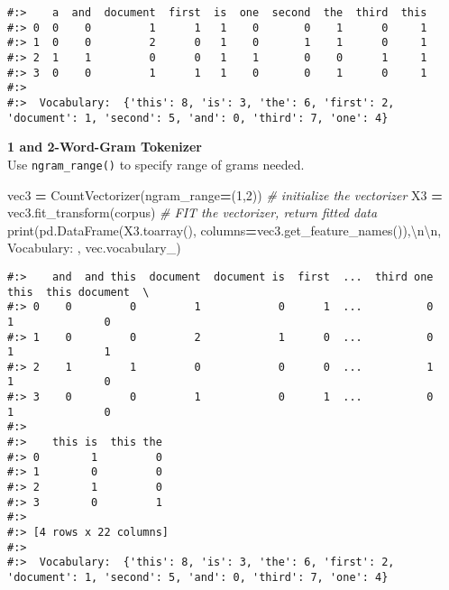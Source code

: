 \documentclass[
]{book}
\newenvironment{Shaded}{\begin{snugshade}}{\end{snugshade}}
\newcommand{\BuiltInTok}[1]{#1}
\newcommand{\CharTok}[1]{\textcolor[rgb]{0.5,0.5,0.5}{#1}}
\newcommand{\CommentTok}[1]{\textcolor[rgb]{0.37,0.37,0.37}{\textit{#1}}}
\newcommand{\DecValTok}[1]{\textcolor[rgb]{0.06,0.06,0.06}{#1}}
\newcommand{\NormalTok}[1]{#1}
\newcommand{\OperatorTok}[1]{\textcolor[rgb]{0.43,0.43,0.43}{\textbf{#1}}}
\newcommand{\StringTok}[1]{\textcolor[rgb]{0.5,0.5,0.5}{#1}}
\begin{document}
\begin{verbatim}
#:>    a  and  document  first  is  one  second  the  third  this
#:> 0  0    0         1      1   1    0       0    1      0     1
#:> 1  0    0         2      0   1    0       1    1      0     1
#:> 2  1    1         0      0   1    1       0    0      1     1
#:> 3  0    0         1      1   1    0       0    1      0     1 
#:> 
#:>  Vocabulary:  {'this': 8, 'is': 3, 'the': 6, 'first': 2, 'document': 1, 'second': 5, 'and': 0, 'third': 7, 'one': 4}
\end{verbatim}

\textbf{1 and 2-Word-Gram Tokenizer}\\
Use \texttt{ngram\_range()} to specify range of grams needed.

\begin{Shaded}
\begin{Highlighting}[]
\NormalTok{vec3 }\OperatorTok{=}\NormalTok{ CountVectorizer(ngram\_range}\OperatorTok{=}\NormalTok{(}\DecValTok{1}\NormalTok{,}\DecValTok{2}\NormalTok{))          }\CommentTok{\# initialize the vectorizer}
\NormalTok{X3   }\OperatorTok{=}\NormalTok{ vec3.fit\_transform(corpus)     }\CommentTok{\# FIT the vectorizer, return fitted data}
\BuiltInTok{print}\NormalTok{(pd.DataFrame(X3.toarray(), columns}\OperatorTok{=}\NormalTok{vec3.get\_feature\_names()),}\StringTok{\textquotesingle{}}\CharTok{\textbackslash{}n\textbackslash{}n}\StringTok{\textquotesingle{}}\NormalTok{,}
      \StringTok{\textquotesingle{}Vocabulary: \textquotesingle{}}\NormalTok{, vec.vocabulary\_)}
\end{Highlighting}
\end{Shaded}

\begin{verbatim}
#:>    and  and this  document  document is  first  ...  third one  this  this document  \
#:> 0    0         0         1            0      1  ...          0     1              0   
#:> 1    0         0         2            1      0  ...          0     1              1   
#:> 2    1         1         0            0      0  ...          1     1              0   
#:> 3    0         0         1            0      1  ...          0     1              0   
#:> 
#:>    this is  this the  
#:> 0        1         0  
#:> 1        0         0  
#:> 2        1         0  
#:> 3        0         1  
#:> 
#:> [4 rows x 22 columns] 
#:> 
#:>  Vocabulary:  {'this': 8, 'is': 3, 'the': 6, 'first': 2, 'document': 1, 'second': 5, 'and': 0, 'third': 7, 'one': 4}
\end{verbatim}
\end{document}
